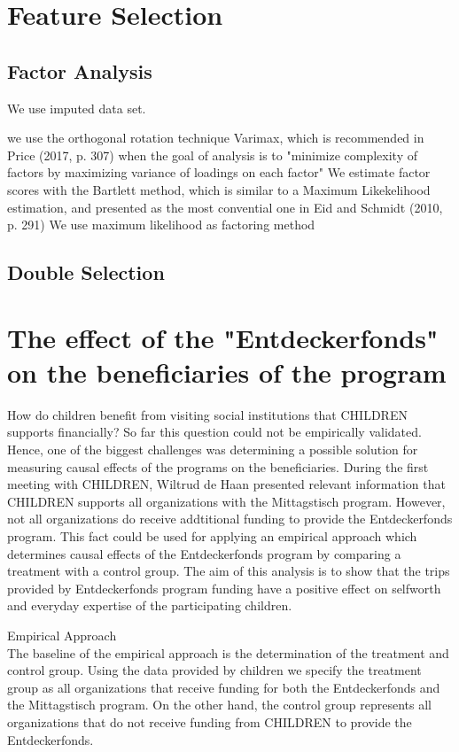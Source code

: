 \documentclass[12pt, a4paper, titlepage]{article}\usepackage[]{graphicx}\usepackage[]{color}
\begin{document}
\section{Feature Selection}

\subsection{Factor Analysis}

We use imputed data set.

we use the orthogonal rotation technique Varimax, which is recommended in Price (2017, p. 307) when the goal of analysis is to "minimize complexity of factors by maximizing variance of loadings on each factor" 
We estimate factor scores with the Bartlett method, which is similar to a Maximum Likekelihood estimation, and presented as the most convential one in Eid and Schmidt (2010, p. 291)
We use maximum likelihood as factoring method

\subsection{Double Selection}

\section{The effect of the "Entdeckerfonds" on the beneficiaries of the program}

How do children benefit from visiting social institutions that CHILDREN supports financially? So far this question could not be empirically validated. Hence, one of the biggest challenges was determining a possible solution for measuring causal effects of the programs on the beneficiaries. During the first meeting with CHILDREN, Wiltrud de Haan presented relevant information that CHILDREN supports all organizations with the Mittagstisch program. However, not all organizations do receive addtitional funding to provide the Entdeckerfonds program. This fact could be used for applying an empirical approach which determines causal effects of the Entdeckerfonds program by comparing a treatment with a control group. The aim of this analysis is to show that the trips provided by Entdeckerfonds program funding have a positive effect on selfworth and everyday expertise of the participating children. 

Empirical Approach\\

The baseline of the empirical approach is the determination of the treatment and control group. Using the data provided by children we specify the treatment group as all organizations that receive funding for both the Entdeckerfonds and the Mittagstisch program. On the other hand, the control group represents all organizations that do not receive funding from CHILDREN to provide the Entdeckerfonds.
\end{document}
